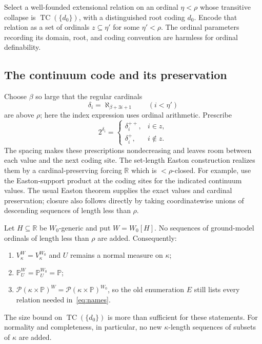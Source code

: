 \documentclass[11pt,letterpaper]{article}
\theoremstyle{definition}
\numberwithin{equation}{section}
\newcommand{\Pow}{\mathcal P}
\newcommand{\PP}{\mathbb P}
\newcommand{\RR}{\mathbb R}
\newcommand{\TC}{\operatorname{TC}}
\begin{document}
Select a well-founded extensional relation on an ordinal $\eta<\rho$ whose transitive collapse is $\TC(\{d_0\})$, with a distinguished root coding $d_0$. Encode that relation as a set of ordinals $z\subseteq\eta'$ for some $\eta'<\rho$. The ordinal parameters recording its domain, root, and coding convention are harmless for ordinal definability.

\subsection{The continuum code and its preservation}

Choose $\beta$ so large that the regular cardinals
\[
\delta_i=\aleph_{\beta+3i+1}\qquad(i<\eta')
\]
are above $\rho$; here the index expression uses ordinal arithmetic. Prescribe
\begin{equation}\label{eq:continuum-code}
2^{\delta_i}=\begin{cases}
\delta_i^{++},&i\in z,\\
\delta_i^{+},&i\notin z.
\end{cases}
\end{equation}
The spacing makes these prescriptions nondecreasing and leaves room between each value and the next coding site. The set-length Easton construction realizes them by a cardinal-preserving forcing $\RR$ which is $<\rho$-closed. For example, use the Easton-support product at the coding sites for the indicated continuum values. The usual Easton theorem supplies the exact values and cardinal preservation; closure also follows directly by taking coordinatewise unions of descending sequences of length less than $\rho$.

Let $H\subseteq\RR$ be $W_0$-generic and put $W=W_0[H]$. No sequences of ground-model ordinals of length less than $\rho$ are added. Consequently:
\begin{enumerate}
\item $V_\kappa^W=V_\kappa^{W_0}$ and $U$ remains a normal measure on $\kappa$;
\item $\PP_U^W=\PP_U^{W_0}=\PP$;
\item $\Pow(\kappa\times\PP)^W=\Pow(\kappa\times\PP)^{W_0}$, so the old enumeration $E$ still lists every relation needed in~\eqref{eq:names}.
\end{enumerate}
The size bound on $\TC(\{d_0\})$ is more than sufficient for these statements. For normality and completeness, in particular, no new $\kappa$-length sequences of subsets of $\kappa$ are added.
\end{document}
